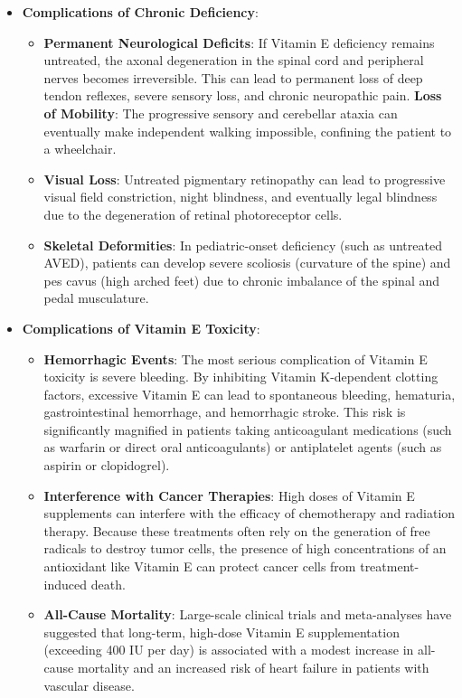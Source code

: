 \begin{itemize}
    \item \textbf{Complications of Chronic Deficiency}:
    \begin{itemize}
        \item \textbf{Permanent Neurological Deficits}: If Vitamin E deficiency remains untreated, the axonal degeneration in the spinal cord and peripheral nerves becomes irreversible. This can lead to permanent loss of deep tendon reflexes, severe sensory loss, and chronic neuropathic pain.
        \textbf{Loss of Mobility}: The progressive sensory and cerebellar ataxia can eventually make independent walking impossible, confining the patient to a wheelchair.
        \item \textbf{Visual Loss}: Untreated pigmentary retinopathy can lead to progressive visual field constriction, night blindness, and eventually legal blindness due to the degeneration of retinal photoreceptor cells.
        \item \textbf{Skeletal Deformities}: In pediatric-onset deficiency (such as untreated AVED), patients can develop severe scoliosis (curvature of the spine) and pes cavus (high arched feet) due to chronic imbalance of the spinal and pedal musculature.
    \end{itemize}
    \item \textbf{Complications of Vitamin E Toxicity}:
    \begin{itemize}
        \item \textbf{Hemorrhagic Events}: The most serious complication of Vitamin E toxicity is severe bleeding. By inhibiting Vitamin K-dependent clotting factors, excessive Vitamin E can lead to spontaneous bleeding, hematuria, gastrointestinal hemorrhage, and hemorrhagic stroke. This risk is significantly magnified in patients taking anticoagulant medications (such as warfarin or direct oral anticoagulants) or antiplatelet agents (such as aspirin or clopidogrel).
        \item \textbf{Interference with Cancer Therapies}: High doses of Vitamin E supplements can interfere with the efficacy of chemotherapy and radiation therapy. Because these treatments often rely on the generation of free radicals to destroy tumor cells, the presence of high concentrations of an antioxidant like Vitamin E can protect cancer cells from treatment-induced death.
        \item \textbf{All-Cause Mortality}: Large-scale clinical trials and meta-analyses have suggested that long-term, high-dose Vitamin E supplementation (exceeding 400 IU per day) is associated with a modest increase in all-cause mortality and an increased risk of heart failure in patients with vascular disease.
    \end{itemize}
\end{itemize}

